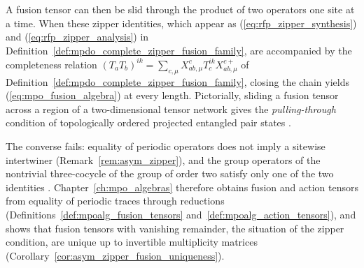 \begin{remark}
    A fusion tensor can then be slid through the product of two operators
    one site at a time. When these zipper identities, which appear as
    (\ref{eq:rfp_zipper_synthesis}) and (\ref{eq:rfp_zipper_analysis}) in
    Definition~\ref{def:mpdo_complete_zipper_fusion_family}, are accompanied
    by the completeness relation
    $(T_aT_b)^{ik}=\sum_{c,\mu}X_{ab,\mu}^cT_c^{ik}X_{ab,\mu}^{c+}$ of
    Definition~\ref{def:mpdo_complete_zipper_fusion_family}, closing the
    chain yields (\ref{eq:mpo_fusion_algebra}) at every length. Pictorially,
    sliding a fusion tensor across a region of a two-dimensional tensor
    network gives the \emph{pulling-through} condition of topologically
    ordered projected entangled pair states
    \cite{Bultinck2017Anyons,Cirac2021Matrix}.

    The converse fails: equality of periodic operators does not imply a
    sitewise intertwiner (Remark~\ref{rem:asym_zipper}), and the group
    operators of the nontrivial three-cocycle of the group of order two
    satisfy only one of the two identities
    \cite[Section~6]{GarreRubio2023MPOSym}. Chapter~\ref{ch:mpo_algebras}
    therefore obtains fusion and action tensors from equality of periodic
    traces through reductions
    (Definitions~\ref{def:mpoalg_fusion_tensors}
    and~\ref{def:mpoalg_action_tensors}), and shows that fusion tensors
    with vanishing remainder, the situation of the zipper condition, are
    unique up to invertible multiplicity matrices
    (Corollary~\ref{cor:asym_zipper_fusion_uniqueness}).
\end{remark}
